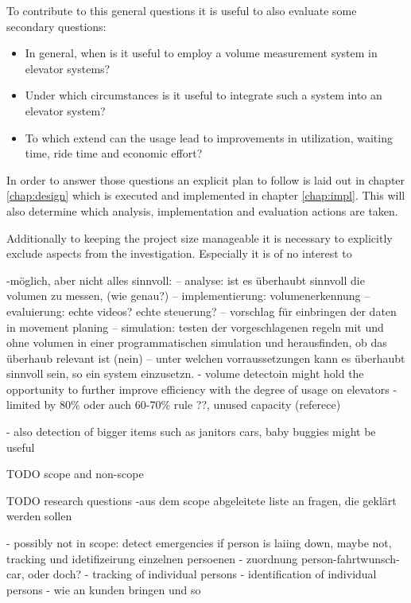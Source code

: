 To contribute to this general questions it is useful to also evaluate some secondary questions:

\begin{itemize}
    \item In general, when is it useful to employ a volume measurement system in elevator systems? 
    \item Under which circumstances is it useful to integrate such a system into an elevator system?
    \item To which extend can the usage lead to improvements in utilization, waiting time, ride time and economic effort?
\end{itemize}

In order to answer those questions an explicit plan to follow is laid out in chapter \ref{chap:design} which is executed and implemented in chapter \ref{chap:impl}. 
This will also determine which analysis, implementation and evaluation actions are taken.

Additionally to keeping the project size manageable it is necessary to explicitly exclude aspects from the  investigation. 
Especially it is of no interest to 


-möglich, aber nicht alles sinnvoll: 
-- analyse: ist es überhaubt sinnvoll die volumen zu messen, (wie genau?)
-- implementierung: volumenerkennung
-- evaluierung: echte videos? echte steuerung?
-- vorschlag für einbringen der daten in movement planing
-- simulation: testen der vorgeschlagenen regeln mit und ohne volumen in einer programmatischen simulation und herausfinden, ob das überhaub relevant ist (nein)
-- unter welchen vorraussetzungen kann es überhaubt sinnvoll sein, so ein system einzusetzn.
- volume detectoin might hold the opportunity to further improve efficiency with the degree of usage on elevators
- limited by 80\% oder auch 60-70\% rule \autocite[][p.~194]{unger2015aufzuege} ??, unused capacity (referece)
 
- also detection of bigger items such as janitors cars, baby buggies  might be useful

TODO scope and non-scope

TODO research questions
-aus dem scope abgeleitete liste an fragen, die geklärt werden sollen

- possibly not in scope: detect emergencies if person is laiing down, maybe not, tracking und idetifizeirung einzelnen persoenen
- zuordnung person-fahrtwunsch-car, oder doch?
- tracking of individual persons
- identification of individual persons
- wie an kunden bringen und so


